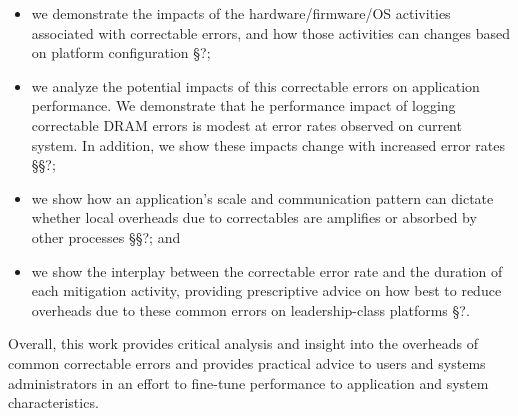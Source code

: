 \begin{itemize}

\item we demonstrate the impacts of the hardware/firmware/OS activities
        associated with correctable errors, and how those activities can changes
        based on platform configuration \S{?};

\item we analyze the potential impacts of this correctable errors on application
        performance.  We demonstrate that he performance impact of logging
                correctable DRAM errors is modest at error rates observed on
                current system.  In addition, we show these impacts change with
                increased error rates \S\S{?};

\item we show how an application's scale and communication pattern can dictate
        whether local overheads due to correctables are amplifies or absorbed by
        other processes \S\S{?}; and

\item we show the interplay between the correctable error rate and the duration
        of each mitigation activity, providing prescriptive advice on how best
        to reduce overheads due to these common errors on leadership-class platforms
        \S{?}.

\end{itemize}

Overall, this work provides critical analysis and insight into the overheads of
common correctable errors and provides practical advice to users and systems
administrators in an effort to fine-tune performance to application and system
characteristics.
